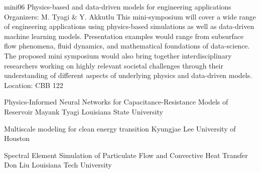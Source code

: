 \mini
{mini06}
{Physics-based and data-driven models for engineering applications}
{Organizers: M. Tyagi \& Y. Akkutlu}
{This mini-symposium will cover a wide range of engineering applications using physics-based simulations as well as data-driven machine learning models. Presentation examples would range from subsurface flow phenomena, fluid dynamics, and mathematical foundations of data-science. The proposed mini symposium would also bring together interdisciplinary researchers working on highly relevant societal challenges through their understanding of different aspects of underlying physics and data-driven models.}
{Location: CBB 122}

\begin{talks}
\item\talk
{Physics-Informed Neural Networks for Capacitance-Resistance Models of Reservoir}
{Mayank Tyagi}
{Louisiana State University}
\item\talk
{Multiscale modeling for clean energy transition}
{Kyungjae Lee}
{University of Houston}
\item\talk
{Spectral Element Simulation of Particulate Flow and Convective Heat Transfer}
{Don Liu}
{Louisiana Tech University}
\end{talks}
\room

